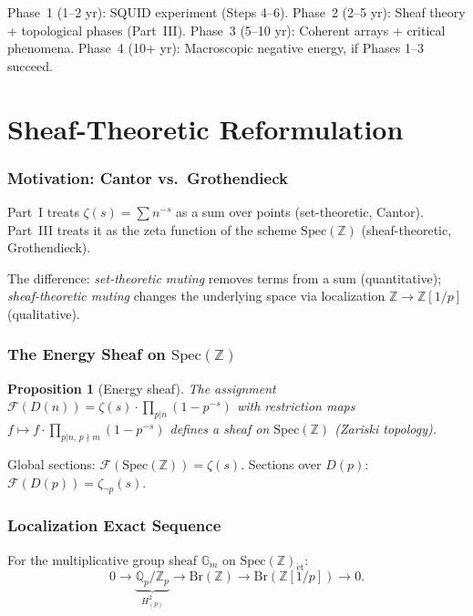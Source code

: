 \documentclass[11pt,a4paper]{article}
\newtheorem{proposition}[theorem]{Proposition}
\newcommand{\Spec}{\mathrm{Spec}}
\newcommand{\Br}{\mathrm{Br}}
\newcommand{\Zp}{\mathbb{Z}[1/p]}
\newcommand{\Qp}{\mathbb{Q}_p}
\newcommand{\Gm}{\mathbb{G}_m}
\begin{document}
Phase~1 (1--2 yr): SQUID experiment (Steps 4--6).
Phase~2 (2--5 yr): Sheaf theory + topological phases (Part~III).
Phase~3 (5--10 yr): Coherent arrays + critical phenomena.
Phase~4 (10+ yr): Macroscopic negative energy, if Phases 1--3 succeed.

\newpage
\part{Sheaf-Theoretic Reformulation}
\label{part:sheaf}

\section{Motivation: Cantor vs.\ Grothendieck}

Part~I treats $\zeta(s) = \sum n^{-s}$ as a sum over points
(set-theoretic, Cantor). Part~III treats it as the zeta function
of the scheme $\Spec(\mathbb{Z})$ (sheaf-theoretic, Grothendieck).

The difference:
\emph{set-theoretic muting} removes terms from a sum (quantitative);
\emph{sheaf-theoretic muting} changes the underlying space via
localization $\mathbb{Z} \to \Zp$ (qualitative).

\section{The Energy Sheaf on $\Spec(\mathbb{Z})$}

\begin{proposition}[Energy sheaf]
The assignment $\mathcal{F}(D(n)) = \zeta(s)\cdot\prod_{p|n}(1-p^{-s})$
with restriction maps $f \mapsto f\cdot\prod_{p|n,\,p\nmid m}(1-p^{-s})$
defines a sheaf on $\Spec(\mathbb{Z})$ (Zariski topology).
\end{proposition}

Global sections: $\mathcal{F}(\Spec(\mathbb{Z})) = \zeta(s)$.
Sections over $D(p)$: $\mathcal{F}(D(p)) = \zeta_{\neg p}(s)$.

\section{Localization Exact Sequence}

For the multiplicative group sheaf $\Gm$ on $\Spec(\mathbb{Z})_{\mathrm{\acute{e}t}}$:
\begin{equation}
  0 \to \underbrace{\Qp/\mathbb{Z}_p}_{H^2_{(p)}} \to \Br(\mathbb{Z})
  \to \Br(\Zp) \to 0.
\end{equation}
\end{document}
